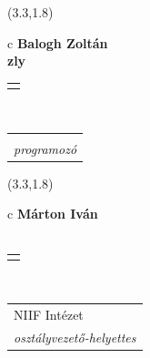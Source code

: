 \documentclass[11pt]{article}
\begin{document}
\makebox(3.3,1.8){
  \renewcommand\arraystretch{1.3}
  \begin{tabular}[c]{c}
    \hspace{8.5mm}
    \LARGE\bf{ Balogh Zoltán }\\
    \hspace{8.5mm}
    \Large{ zly }\\
    \renewcommand\arraystretch{3}
    \begin{tabular}[c]{c}
      \centering
      \fontfamily{phv}\selectfont{
        \textbf{
          \textsc{
            \scriptsize{
            \color{Bright}{ Ismerkedő }\color{Bright}{ Webmester }\color{Bright}{ Sminkmester }\color{Dark}{ Programozó }
            }
          }
        }
      }
    \end{tabular}
    \\
    \renewcommand\arraystretch{1}
    \begin{tabular}{p{3.3in}}
      \hspace{.7cm}\\
      \hspace{.7cm}\emph{ programozó }\\
    \end{tabular}
  \end{tabular}
}

\makebox(3.3,1.8){
  \renewcommand\arraystretch{1.3}
  \begin{tabular}[c]{c}
    \hspace{8.5mm}
    \LARGE\bf{ Márton Iván }\\
    \hspace{8.5mm}
    \Large{  }\\
    \renewcommand\arraystretch{3}
    \begin{tabular}[c]{c}
      \centering
      \fontfamily{phv}\selectfont{
        \textbf{
          \textsc{
            \scriptsize{
            \color{Bright}{ Ismerkedő }\color{Dark}{ Webmester }\color{Bright}{ Sminkmester }\color{Dark}{ Programozó }
            }
          }
        }
      }
    \end{tabular}
    \\
    \renewcommand\arraystretch{1}
    \begin{tabular}{p{3.3in}}
      \hspace{.7cm}NIIF Intézet\\
      \hspace{.7cm}\emph{ osztályvezető-helyettes }\\
    \end{tabular}
  \end{tabular}
}
\end{document}
